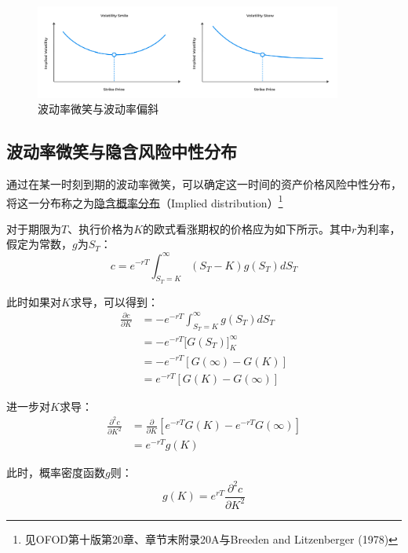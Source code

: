 \documentclass[11pt]{article}
\begin{document}
\begin{figure}[H]
    \centering
    \includegraphics[width=0.9\textwidth]{fig/volatility-smile-skew.png}
    \caption{波动率微笑与波动率偏斜}
    \label{fig:volatility-smile-skew}
\end{figure}

\subsection{波动率微笑与隐含风险中性分布}

通过在某一时刻到期的波动率微笑，可以确定这一时间的资产价格风险中性分布，将这一分布称之为\uline{隐含概率分布}（Implied distribution）\footnote{见OFOD第十版第20章、章节末附录20A与Breeden and Litzenberger (1978)}

对于期限为$T$、执行价格为$K$的欧式看涨期权的价格应为如下所示。其中$r$为利率，假定为常数，$g$为$S_T$：
\begin{equation*}
    c = e^{-rT} \int_{S_T=K}^{\infty} \left( S_T - K \right) g(S_T) dS_T
\end{equation*}

此时如果对$K$求导，可以得到：
\begin{align*}
    \frac{\partial c}{\partial K} &= -e^{-rT} \int_{S_T=K}^{\infty} g(S_T) dS_T \\
    &= -e^{-rT} \bigg[ G(S_T) \bigg]_{K}^{\infty} \\
    &= -e^{-rT} \left[ G(\infty) - G(K) \right] \\
    &= e^{-rT} \left[ G(K) - G(\infty) \right]
\end{align*}

进一步对$K$求导：
\begin{align*}
    \frac{\partial^2 c}{\partial K^2} &= \frac{\partial }{\partial K} \left[ e^{-rT} G(K) - e^{-rT} G(\infty) \right] \\
    &= e^{-rT}g(K)
\end{align*}

此时，概率密度函数$g$则：
\begin{equation*}
    g(K) = e^{rT} \frac{\partial^2 c}{\partial K^2}
\end{equation*}
\end{document}
